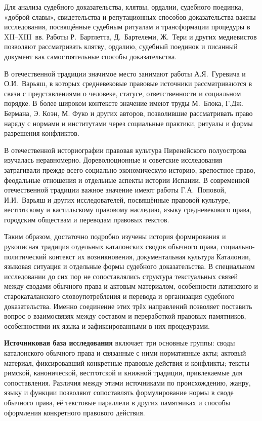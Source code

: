 Для анализа судебного доказательства, клятвы, ордалии, судебного поединка, «доброй славы», свидетельства и репутационных способов доказательства важны исследования, посвящённые судебным ритуалам и трансформации процедуры в XII--XIII~вв. Работы Р.~Бартлетта, Д.~Бартелеми, Ж.~Тери и других медиевистов позволяют рассматривать клятву, ордалию, судебный поединок и писанный документ как самостоятельные способы доказательства.

В отечественной традиции значимое место занимают работы А.Я.~Гуревича и О.И.~Варьяш, в которых средневековые правовые источники рассматриваются в связи с представлениями о человеке, статусе, ответственности и социальном порядке. В более широком контексте значение имеют труды М.~Блока, Г.Дж. Бермана, Э. Коэн, М. Фуко и других авторов, позволившие рассматривать право наряду с нормами и институтами через социальные практики, ритуалы и формы разрешения конфликтов.

В отечественной историографии правовая культура Пиренейского полуострова изучалась неравномерно. Дореволюционные и советские исследования затрагивали прежде всего социально-экономическую историю, крепостное право, феодальные отношения и отдельные аспекты истории Испании. В современной отечественной традиции важное значение имеют работы Г.А.~Поповой, И.И.~Варьяш и других исследователей, посвящённые правовой культуре, вестготскому и кастильскому правовому наследию, языку средневекового права, городским обществам и переводам правовых текстов.

Таким образом, достаточно подробно изучены история формирования и рукописная традиция отдельных каталонских сводов обычного права, социально-политический контекст их возникновения, документальная культура Каталонии, языковая ситуация и отдельные формы судебного доказательства. В специальном исследовании до сих пор не сопоставлялись структура текстуальных связей между сводами обычного права и актовым материалом, особенности латинского и старокаталанского словоупотребления и перевода и организация судебного доказательства. Именно соединение этих трёх направлений позволяет поставить вопрос о взаимосвязях между составом и переработкой правовых памятников, особенностями их языка и зафиксированными в них процедурами.

\textbf{Источниковая база исследования }включает три основные группы: своды каталонского обычного права и связанные с ними нормативные акты; актовый материал, фиксировавший конкретные правовые действия и конфликты; тексты римской, канонической, вестготской и книжной традиции, привлекаемые для сопоставления. Различия между этими источниками по происхождению, жанру, языку и функции позволяют сопоставлять формулирование нормы в своде обычного права, её текстовые параллели в других памятниках и способы оформления конкретного правового действия.

